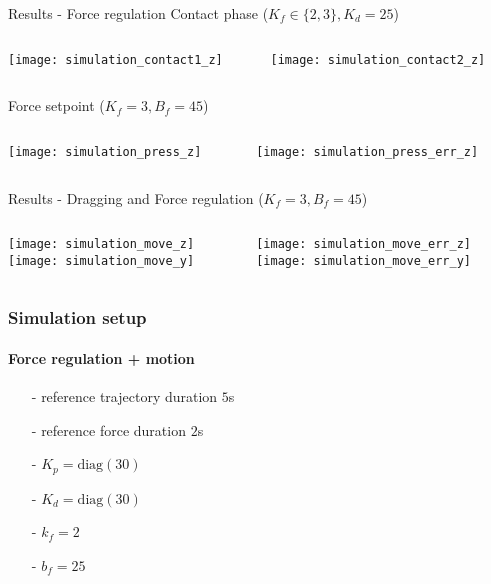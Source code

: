 \begin{frame}{Results - Force regulation}
  Contact phase ($K_f \in \{2,3\}, K_d = 25$)
  \vskip0.1in
  \begin{columns}
    \begin{column}{0.4\textwidth}
      \texttt{[image: simulation\_contact1\_z]}
    \end{column}
    \begin{column}{0.4\textwidth}
      \texttt{[image: simulation\_contact2\_z]}
    \end{column}
  \end{columns}
  Force setpoint ($K_f = 3, B_f = 45 $)
  \vskip0.03in
  \begin{columns}
    \begin{column}{0.4\textwidth}
      \texttt{[image: simulation\_press\_z]}
    \end{column}
    \begin{column}{0.4\textwidth}
      \texttt{[image: simulation\_press\_err\_z]}
    \end{column}
  \end{columns}
\end{frame}

\begin{frame}{Results - Dragging and Force regulation \hfill($K_f = 3, B_f = 45 $)}
  \vskip0.1in
  \begin{columns}
    \begin{column}{0.5\textwidth}
      \texttt{[image: simulation\_move\_z]}\\
      \texttt{[image: simulation\_move\_y]}
    \end{column}
    \begin{column}{0.5\textwidth}
      \texttt{[image: simulation\_move\_err\_z]}\\
      \texttt{[image: simulation\_move\_err\_y]}
    \end{column}
  \end{columns}
\end{frame}

\begin{frame}
  \frametitle{Simulation setup}
  \framesubtitle{Force regulation + motion}
  \begin{itemize}
  \item[-] reference trajectory duration $5$s
  \item[-] reference force duration $2$s
  \item[-] $K_p = \mathrm{diag}(30)$
  \item[-] $K_d = \mathrm{diag}(30)$
  \item[-] $k_{f} = 2$
  \item[-] $b_f = 25$
  \end{itemize}
\end{frame}
